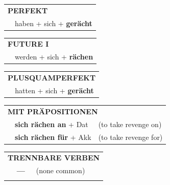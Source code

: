 \documentclass[10pt,a4paper]{revtex4-2}
\begin{document}
\begin{verbbox}
 \begin{tabular}{rl}
     \multicolumn{2}{l}{\textbf{PERFEKT}}\\
   & haben + sich + \textbf{gerächt}\\
  \end{tabular}
\hfill
   \begin{tabular}{rl}
    \multicolumn{2}{l}{\textbf{FUTURE I} }\\
   & werden + sich + \textbf{rächen}\\
  \end{tabular}
\hfill
   \begin{tabular}{rl}
      \multicolumn{2}{l}{\textbf{PLUSQUAMPERFEKT}}\\
   & hatten + sich + \textbf{gerächt}\\
  \end{tabular}

   \vspace{10pt}

   \begin{tabular}{lll}
      \multicolumn{3}{l}{\textbf{MIT PRÄPOSITIONEN}}\\
& \textbf{sich rächen an} + Dat & (to take revenge on)\\
& \textbf{sich rächen für} + Akk & (to take revenge for)\\
\end{tabular}
  \hfill
   \begin{tabular}{lll}
      \multicolumn{3}{l}{\textbf{TRENNBARE VERBEN}}\\
 & \textbf{---} & (none common)\\
\vspace{10pt}
  \end{tabular}

  \vspace{-5pt}

\end{verbbox}
\end{document}
